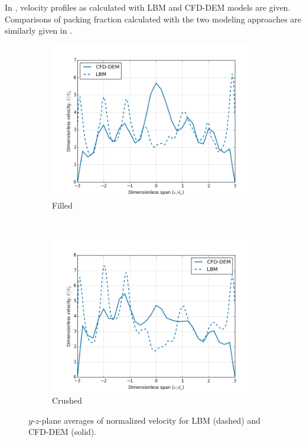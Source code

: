 In , velocity profiles as calculated with LBM and CFD-DEM models are given. Comparisons of packing fraction calculated with the two modeling approaches are similarly given in .
\begin{figure}[!ht]
    \centering
    \begin{subfigure}[b]{0.44\textwidth}
        \includegraphics[width = \textwidth]{figures/lbm/y-v-profiles-filled-cfd-dem}
        \caption{Filled}\label{fig:lbm-cfd-dem-velocity-filled}
    \end{subfigure}
    ~
    \begin{subfigure}[b]{0.44\textwidth}
        \includegraphics[width = \textwidth]{figures/lbm/y-v-profiles-crushed-cfd-dem}
        \caption{Crushed}\label{fig:lbm-cfd-dem-velocity-crushed}
    \end{subfigure}
    \caption{$y$-$z$-plane averages of normalized velocity for LBM (dashed) and CFD-DEM (solid).}\label{fig:lbm-cfd-dem-velocity}
\end{figure}

